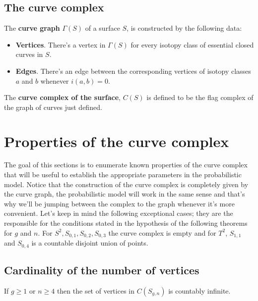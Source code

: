 \subsection{The curve complex}

\begin{defini}
The \textbf{curve graph} $\Gamma(S)$ of a surface $S$, is constructed by the following data:
\begin{itemize}
\item \textbf{Vertices}. There's a vertex in $\Gamma(S)$ for every isotopy class of essential closed curves in $S$.
\item \textbf{Edges}. There's an edge between the corresponding vertices of isotopy classes $a$ and $b$ whenever $i(a,b)=0$.
\end{itemize}
\end{defini}

\begin{defini}
The \textbf{curve complex of the surface}, $C(S)$ is defined to be the flag complex of the graph of curves just defined.
\end{defini}

\section{Properties of the curve complex}
The goal of this sections is to enumerate known properties of the curve complex that will be useful to establish the appropriate parameters in the probabilistic model. Notice that the construction of the curve complex is completely given by the curve graph, the probabilistic model will work in the same sense and that's why we'll be jumping between the complex to the graph whenever it's more convenient. Let's keep in mind the following exceptional cases; they are the responsible for the conditions stated in the hypothesis of the following theorems for $g$ and $n$. For $ S^2, S_{0,1}, S _{0,2}, S_{0,3} $ the curve complex is empty and for  $ T^{2} $, $ S_{1,1}$ and $ S_{0,4}$ is a countable disjoint union of points.

\subsection{Cardinality of the number of vertices}
\begin{theorem}
If $g\geq 1$ or $n\geq 4$ then the set of vertices in $C(S_{g,n})$ is countably infinite.
\end{theorem}

